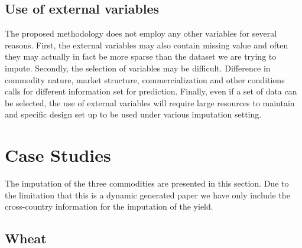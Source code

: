 \documentclass[nojss]{jss}\usepackage[]{graphicx}\usepackage[]{color}
\begin{document}
\subsection{Use of external variables}
The proposed methodology does not employ any other variables for
several reasons. First, the external variables may also contain
missing value and often they may actually in fact be more sparse than
the dataset we are trying to impute. Secondly, the selection of
variables may be difficult. Difference in commodity nature, market
structure, commercialization and other conditions calls for different
information set for prediction. Finally, even if a set of data can be
selected, the use of external variables will require large resources
to maintain and specific design set up to be used under various
imputation setting.\\


\section{Case Studies}

The imputation of the three commodities are presented in this
section. Due to the limitation that this is a dynamic generated paper
we have only include the cross-country information for the imputation
of the yield.


\subsection{Wheat}
\end{document}
